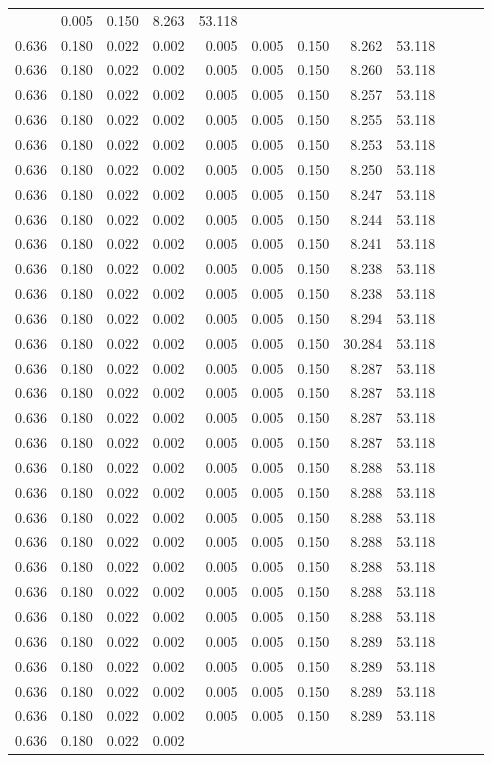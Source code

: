 \begin{longtable}{rrrrrrrrrrrr}
& 0.005 & 0.150 & 8.263 & 53.118 \\0.636 & 0.180 & 0.022 & 0.002 & 0.005 & 0.005 & 0.150 & 8.262 & 53.118 \\0.636 & 0.180 & 0.022 & 0.002 & 0.005 & 0.005 & 0.150 & 8.260 & 53.118 \\0.636 & 0.180 & 0.022 & 0.002 & 0.005 & 0.005 & 0.150 & 8.257 & 53.118 \\0.636 & 0.180 & 0.022 & 0.002 & 0.005 & 0.005 & 0.150 & 8.255 & 53.118 \\0.636 & 0.180 & 0.022 & 0.002 & 0.005 & 0.005 & 0.150 & 8.253 & 53.118 \\0.636 & 0.180 & 0.022 & 0.002 & 0.005 & 0.005 & 0.150 & 8.250 & 53.118 \\0.636 & 0.180 & 0.022 & 0.002 & 0.005 & 0.005 & 0.150 & 8.247 & 53.118 \\0.636 & 0.180 & 0.022 & 0.002 & 0.005 & 0.005 & 0.150 & 8.244 & 53.118 \\0.636 & 0.180 & 0.022 & 0.002 & 0.005 & 0.005 & 0.150 & 8.241 & 53.118 \\0.636 & 0.180 & 0.022 & 0.002 & 0.005 & 0.005 & 0.150 & 8.238 & 53.118 \\0.636 & 0.180 & 0.022 & 0.002 & 0.005 & 0.005 & 0.150 & 8.238 & 53.118 \\0.636 & 0.180 & 0.022 & 0.002 & 0.005 & 0.005 & 0.150 & 8.294 & 53.118 \\0.636 & 0.180 & 0.022 & 0.002 & 0.005 & 0.005 & 0.150 & 30.284 & 53.118 \\0.636 & 0.180 & 0.022 & 0.002 & 0.005 & 0.005 & 0.150 & 8.287 & 53.118 \\0.636 & 0.180 & 0.022 & 0.002 & 0.005 & 0.005 & 0.150 & 8.287 & 53.118 \\0.636 & 0.180 & 0.022 & 0.002 & 0.005 & 0.005 & 0.150 & 8.287 & 53.118 \\0.636 & 0.180 & 0.022 & 0.002 & 0.005 & 0.005 & 0.150 & 8.287 & 53.118 \\0.636 & 0.180 & 0.022 & 0.002 & 0.005 & 0.005 & 0.150 & 8.288 & 53.118 \\0.636 & 0.180 & 0.022 & 0.002 & 0.005 & 0.005 & 0.150 & 8.288 & 53.118 \\0.636 & 0.180 & 0.022 & 0.002 & 0.005 & 0.005 & 0.150 & 8.288 & 53.118 \\0.636 & 0.180 & 0.022 & 0.002 & 0.005 & 0.005 & 0.150 & 8.288 & 53.118 \\0.636 & 0.180 & 0.022 & 0.002 & 0.005 & 0.005 & 0.150 & 8.288 & 53.118 \\0.636 & 0.180 & 0.022 & 0.002 & 0.005 & 0.005 & 0.150 & 8.288 & 53.118 \\0.636 & 0.180 & 0.022 & 0.002 & 0.005 & 0.005 & 0.150 & 8.288 & 53.118 \\0.636 & 0.180 & 0.022 & 0.002 & 0.005 & 0.005 & 0.150 & 8.289 & 53.118 \\0.636 & 0.180 & 0.022 & 0.002 & 0.005 & 0.005 & 0.150 & 8.289 & 53.118 \\0.636 & 0.180 & 0.022 & 0.002 & 0.005 & 0.005 & 0.150 & 8.289 & 53.118 \\0.636 & 0.180 & 0.022 & 0.002 & 0.005 & 0.005 & 0.150 & 8.289 & 53.118 \\0.636 & 0.180 & 0.022 & 0.002 & 
\end{longtable}
